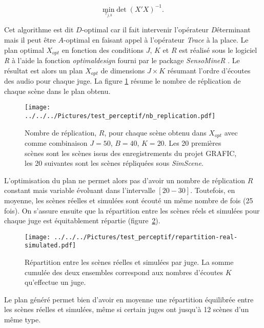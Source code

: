 \begin{equation}\label{eq:mini_det_BIE}
\underset{\tau_{j,b}}{\text{min}} \det(X'X)^{-1}.
\end{equation}

Cet algorithme est dit $D$-optimal car il fait intervenir l'opérateur \textit{D}éterminant mais il peut être $A$-optimal en faisant appel à l'opérateur \textit{Trace} à la place. Le plan optimal $X_{opt}$ en fonction des conditions $J$, $K$ et $R$ est réalisé sous le logiciel \textit{R} à l'aide la fonction \textit{optimaldesign} fourni par le package \textit{SensoMineR} \cite{le_sensominer:_2008}. Le résultat est alors un plan $X_{opt}$ de dimensions $J \times K$ résumant l'ordre d'écoutes des audio pour chaque juge. La figure \ref{fig:replication} résume le nombre de réplication de chaque scène dans le plan obtenu.\\

\begin{figure}[ht]
\centering
\texttt{[image: ../../../Pictures/test\_perceptif/nb\_replication.pdf]}
\caption{Nombre de réplication, $R$, pour chaque scène obtenu dans $X_{opt}$ avec comme combinaison $J = 50$, $B = 40$, $K = 20$. Les 20 premières scènes sont les scènes issus des enregistrements du projet GRAFIC, les 20 suivantes sont les scènes répliquées sous \textit{SimScene}.}
\label{fig:replication}
\end{figure}

L'optimisation du plan ne permet alors pas d'avoir un nombre de réplication $R$ constant mais variable évoluant dans l'intervalle $\left[20-30 \right]$. Toutefois, en moyenne, les scènes réelles et simulées sont écouté un même nombre de fois (25 fois). On s'assure ensuite que la répartition entre les scènes réels et simulées pour chaque juge est équitablement répartie (figure~\ref{fig:repartition}).\\

\begin{figure}[ht]
\centering
\texttt{[image: ../../../Pictures/test\_perceptif/repartition-real-simulated.pdf]}
\caption{Répartition entre les scènes réelles et simulées par juge. La somme cumulée des deux ensembles correspond aux nombres d'écoutes $K$ qu'effectue un juge.}
\label{fig:repartition}
\end{figure}

Le plan généré permet bien d'avoir en moyenne une répartition équilibrée entre les scènes réelles et simulées, même si certain juges ont jusqu'à 12 scènes d'un même type.\\

